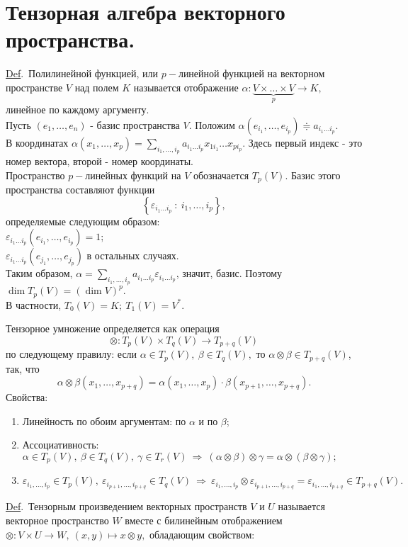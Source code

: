 \documentclass[a4paper]{article}%
\newcommand{\eps}{\varepsilon}
\renewcommand{\de}{\par\noindent\underline{Def}.\ }%
\renewcommand{\ab}{\par\noindent}%
\newcommand{\baz}[1]{\left(#1_1,\dots,#1_n\right)}%
\newcommand{\ty}{\otimes}
\begin{document}
\section{Тензорная алгебра векторного пространства.}
\label{q59}
\de Полилинейной функцией, или $p-$линейной функцией на векторном пространстве $V$ над полем $K$ называется
отображение $\alpha:\underbrace{V\times\dots\times V}_p\rightarrow K,$ линейное по каждому аргументу.\\
Пусть $\baz{e}$ - базис пространства $V$. Положим $\alpha(e_{i_1},\dots,e_{i_p})\doteqdot a_{i_1\dots i_p}.$
\\В координатах $\alpha(x_1,\dots,x_p)=\sum\limits_{i_1,\dots,i_p}a_{i_1\dots i_p}x_{1i_1}\dots x_{pi_p}.$ Здесь
первый индекс - это номер вектора, второй - номер координаты.\\
Пространство $p-$линейных функций на $V$ обозначается $T_p(V).$ Базис этого пространства составляют функции
$$
\left\{\eps_{i_1\dots i_p}\ :\ i_1,\dots,i_p\right\},
$$
определяемые следующим образом:
\\
$\eps_{i_1\dots i_p}(e_{i_1},\dots,e_{i_p})=1;$\\
$\eps_{i_1\dots i_p}(e_{j_1},\dots,e_{j_p})$ в остальных случаях.
\\
Таким образом, $\alpha=\sum\limits_{i_1,\dots,i_p}a_{i_1\dots i_p}\eps_{i_1\dots i_p}$, значит, базис. Поэтому
$\dim T_p(V)=(\dim V)^p.$\\ В частности, $T_0(V)=K;\ T_1(V)=V^*.$
\ab Тензорное умножение определяется как операция
$$
\ty:T_p(V)\times T_q(V)\rightarrow T_{p+q}(V)
$$
по следующему правилу: если $\alpha\in T_p(V),\ \beta\in T_q(V),$ то $\alpha\ty\beta\in T_{p+q}(V)$, так, что
$$
\alpha\ty\beta(x_1,\dots,x_{p+q})=\alpha(x_1,\dots,x_p)\cdot\beta(x_{p+1},\dots,x_{p+q}).
$$
Свойства: \begin{enumerate}
    \item Линейность по обоим аргументам: по $\alpha$ и по $\beta$;
    \item Ассоциативность: $\alpha\in T_p(V),\ \beta\in T_q(V),\ \gamma\in T_r(V)\ \Rightarrow\ (\alpha\ty\beta)\ty\gamma=\alpha\ty(\beta\ty\gamma);$
    \item $\eps_{i_1,\dots,i_p}\in T_p(V),\ \eps_{i_{p+1},\dots,i_{p+q}}\in T_q(V)\ \Rightarrow\ \eps_{i_1,\dots,i_p}\ty\eps_{i_{p+1},\dots,i_{p+q}}=\eps_{i_1,\dots,i_{p+q}}\in T_{p+q}(V).$
\end{enumerate}
\de Тензорным произведением векторных пространств $V$ и $U$ называется векторное пространство $W$ вместе с билинейным отображением
$\ty:V\times U\rightarrow W,\ (x,y)\mapsto x\ty y,$ обладающим свойством:
\end{document}
